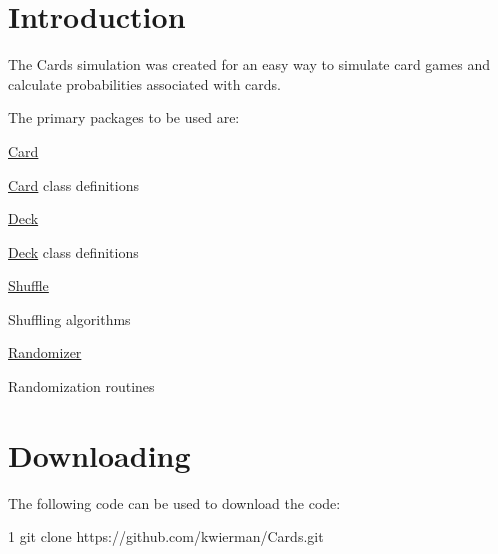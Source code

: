 \hypertarget{index_intro}{}\section{Introduction}\label{index_intro}
The Cards simulation was created for an easy way to simulate card games and calculate probabilities associated with cards.

The primary packages to be used are\-:
\begin{DoxyItemize}
\item \hyperlink{namespaceCard}{Card}
\begin{DoxyItemize}
\item \hyperlink{namespaceCard}{Card} class definitions
\end{DoxyItemize}
\item \hyperlink{namespaceDeck}{Deck}
\begin{DoxyItemize}
\item \hyperlink{namespaceDeck}{Deck} class definitions
\end{DoxyItemize}
\item \hyperlink{namespaceShuffle}{Shuffle}
\begin{DoxyItemize}
\item Shuffling algorithms
\end{DoxyItemize}
\item \hyperlink{namespaceRandomizer}{Randomizer}
\begin{DoxyItemize}
\item Randomization routines
\end{DoxyItemize}
\end{DoxyItemize}\hypertarget{index_downloading}{}\section{Downloading}\label{index_downloading}
The following code can be used to download the code\-: 
\begin{DoxyCode}
1 git clone https://github.com/kwierman/Cards.git
\end{DoxyCode}
 